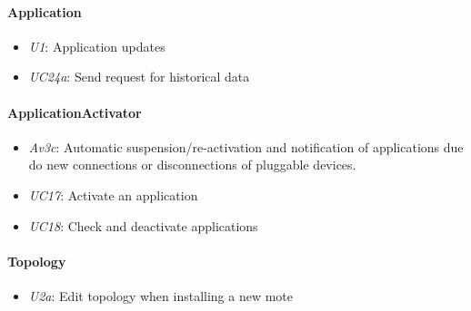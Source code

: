 \documentclass[english]{sareport}
\begin{document}
\paragraph{Application}
\begin{itemize}
	\item \emph{U1}: Application updates
	\item \emph{UC24a}: Send request for historical data
\end{itemize}

\paragraph{ApplicationActivator}
\begin{itemize}
	\item \emph{Av3c}: Automatic suspension/re-activation and notification of applications due do new connections or disconnections of pluggable devices.
	\item \emph{UC17}: Activate an application
	\item \emph{UC18}: Check and deactivate applications
\end{itemize}

\paragraph{Topology}
\begin{itemize}
	\item \emph{U2a}: Edit topology when installing a new mote
\end{itemize}
\end{document}
